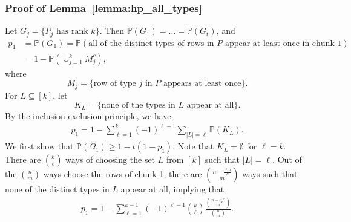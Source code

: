 \documentclass{article}
\newcommand{\mprob}{\mathbb{P}}
\begin{document}

\subsubsection{Proof of Lemma~\ref{lemma:hp_all_types}}
\label{AppLemHPAll}

Let $G_j = \{P_j \text{ has rank } k\}$. Then $\mathbb{P}(G_1) = \dots = \mathbb{P}(G_t)$, and
\begin{align*}
p_1 &= \mathbb{P}(G_1) = \mathbb{P}(\text{all of the distinct  types of rows in } P \text{ appear at least once in chunk } 1)\\
&= 1 - \mathbb{P}(\cup_{j = 1}^kM_j^c),
\end{align*}
where
\begin{equation*}
M_j = \{\text{row of type } j \text{ in } P \text{ appears at least once}\}.
\end{equation*}
For $L \subseteq [k]$, let
\begin{equation*}
K_L = \{\text{none of the types in } L \text{ appear at all}\}.
\end{equation*}
By the inclusion-exclusion principle, we have
\begin{align*}
p_1 = 1 - \sum_{\ell = 1}^k (-1)^{\ell - 1}\sum_{|L| = \ell}\mathbb{P}(K_L).
\end{align*}
We first show that $\mprob(\Omega_1) \ge 1 - t(1-p_1)$. Note that $K_L = \emptyset$ for $\ell = k$. There are \(\binom{k}{\ell}\) ways of choosing the set $L$ from $[k]$ such that $|L| = \ell$. Out of the \(\binom{n}{m}\) ways choose the rows of chunk 1, there are $\binom{n - \frac{\ell n}{k}}{m}$ ways such that none of the distinct types in $L$ appear at all, implying that
\begin{align*}
p_1 = 1 - \sum_{\ell = 1}^{k  -1} (-1)^{\ell - 1} \binom{k}{\ell}\frac{\binom{n - \frac{\ell n}{k}}{m}}{\binom{n}{m}}.
\end{align*}
\end{document}
